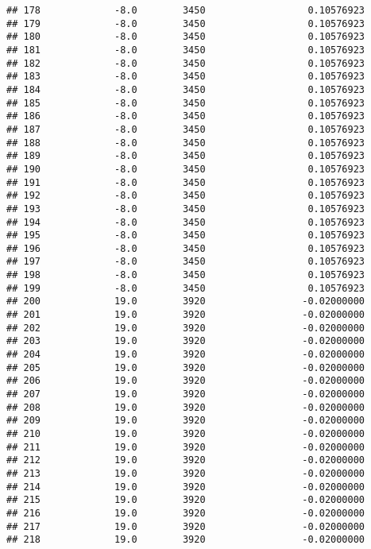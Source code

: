 \documentclass[]{article}
\begin{document}
\begin{verbatim}
## 178             -8.0        3450                  0.10576923
## 179             -8.0        3450                  0.10576923
## 180             -8.0        3450                  0.10576923
## 181             -8.0        3450                  0.10576923
## 182             -8.0        3450                  0.10576923
## 183             -8.0        3450                  0.10576923
## 184             -8.0        3450                  0.10576923
## 185             -8.0        3450                  0.10576923
## 186             -8.0        3450                  0.10576923
## 187             -8.0        3450                  0.10576923
## 188             -8.0        3450                  0.10576923
## 189             -8.0        3450                  0.10576923
## 190             -8.0        3450                  0.10576923
## 191             -8.0        3450                  0.10576923
## 192             -8.0        3450                  0.10576923
## 193             -8.0        3450                  0.10576923
## 194             -8.0        3450                  0.10576923
## 195             -8.0        3450                  0.10576923
## 196             -8.0        3450                  0.10576923
## 197             -8.0        3450                  0.10576923
## 198             -8.0        3450                  0.10576923
## 199             -8.0        3450                  0.10576923
## 200             19.0        3920                 -0.02000000
## 201             19.0        3920                 -0.02000000
## 202             19.0        3920                 -0.02000000
## 203             19.0        3920                 -0.02000000
## 204             19.0        3920                 -0.02000000
## 205             19.0        3920                 -0.02000000
## 206             19.0        3920                 -0.02000000
## 207             19.0        3920                 -0.02000000
## 208             19.0        3920                 -0.02000000
## 209             19.0        3920                 -0.02000000
## 210             19.0        3920                 -0.02000000
## 211             19.0        3920                 -0.02000000
## 212             19.0        3920                 -0.02000000
## 213             19.0        3920                 -0.02000000
## 214             19.0        3920                 -0.02000000
## 215             19.0        3920                 -0.02000000
## 216             19.0        3920                 -0.02000000
## 217             19.0        3920                 -0.02000000
## 218             19.0        3920                 -0.02000000

\end{verbatim}
\end{document}
